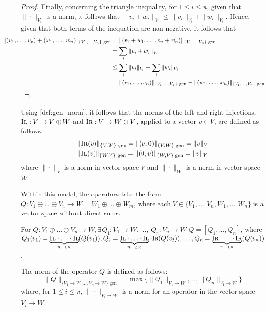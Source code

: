 \begin{proof}
Finally, concerning the triangle inequality, for $ 1 \leq i \leq n$,  given that  $\|\cdot\|_{V_i}$ is a norm, it follows that $\|v_i + w_i\|_{V_i} \leq \|v_i\|_{V_i} + \|w_i\|_{V_i}$. Hence, given that both terms of the inequation are non-negative, it follows that
\begin{align*}
   \hspace {-30pt}\|(v_1, \ldots, v_n) + (w_1, \ldots, w_n)\|_{\{V_1,\ldots,V_n\} \text{ gen}} & = \|(v_1 + w_1, \ldots, v_n + w_n)\|_{\{V_1,\ldots,V_n\} \text{ gen}} \\
  & = \sum_i \|v_i + w_i\|_{V_i} \\
  &\leq \sum_i \|v_i\|_{V_i} + \sum_i \|w_i\|_{V_i} \\
  &=\|(v_1, \ldots, v_n)\|_{\{V_1,\ldots,V_n\} \text{ gen}} + \|(w_1, \ldots, w_n)\|_{\{V_1,\ldots,V_n\} \text{ gen}}  \\
\end{align*}
\end{proof}

Using \autoref{def:gen_norm}, it follows that the norms of the left and right injections, $\textsc{Il}: V \rightarrow V \oplus W$ and $\textsc{Ir}:V \rightarrow W \oplus V$, applied to a vector $v \in V$, are defined as follows:
  \begin{equation}
    \begin{split}
    &\|\textsc{Ir}(v)\|_{\{V, W\} \text{ gen}} =  \| (v,0) \|_{\{ V, W\} \text{ gen}} = \|v\|_{V} \\
    &\|\textsc{Il}(v)\|_{\{ W,  V\} \text{ gen}} =  \| (0,v) \|_{\{ W,  V\} \text{ gen}} = \|v\|_{V}
    \end{split}
  \end{equation}
where $\|\cdot\|_{V}$ is a norm in vector space $V$ and $\|\cdot\|_{W}$ is a norm in vector space $W$.
 
Within this model, the operators take the form $Q: V_1 \oplus \ldots \oplus V_n  \rightarrow W = W_1 \oplus \ldots \oplus W_m$, where each $V \in \{V_1, \ldots, V_n, W_1, \ldots, W_n\}$ is a vector space without direct sums.

\begin{definition} \label{def:gen_norm_either}
For $Q: V_1 \oplus \ldots \oplus V_n  \rightarrow W, \exists \hspace{1pt} Q_1: V_1 \rightarrow W$, $\ldots$, $Q_n: V_n \rightarrow W$  $Q=[Q_1, \ldots, Q_n]$, where $Q_1 (v_1) = \underbrace{\textsc{Il} \cdot \ldots \cdot \textsc{Il}}_{n-1 \times } (Q (v_1)), Q_2 = \underbrace{\textsc{Il} \cdot \ldots \cdot \textsc{Il}}_{n-2 \times } \cdot \textsc{Ir} (Q(v_2)), \ldots, Q_n =  \underbrace{\textsc{Ir} \cdot \ldots \cdot \textsc{Ir}}_{n-1 \times } (Q(v_n))$.

The norm of the operator $Q$ is defined as follows:
\begin{equation}
\|Q\|_{\{V_1\rightarrow W, \ldots, V_n\rightarrow W\} \text{ gen}} = \max \{\|Q_1\|_{V_1 \rightarrow W}, \ldots, \|Q_n\|_{V_1 \rightarrow W}  \}
\end{equation}
where, for $1 \leq i \leq n $, $\|\cdot \|_{V_i \rightarrow W}$ is a norm for an operator in the vector space $V_i \rightarrow W$.
\end{definition}

